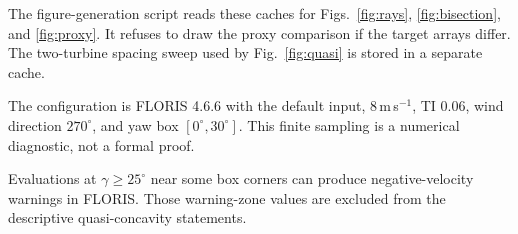 \documentclass[wes, manuscript]{copernicus}
\begin{document}
The figure-generation script reads these caches for Figs.~\ref{fig:rays}, \ref{fig:bisection}, and \ref{fig:proxy}. It refuses to draw the proxy comparison if the target arrays differ. The two-turbine spacing sweep used by Fig.~\ref{fig:quasi} is stored in a separate cache.

The configuration is FLORIS 4.6.6 with the default input, 8\,m\,s$^{-1}$, TI 0.06, wind direction $270^\circ$, and yaw box $[0^\circ,30^\circ]$. This finite sampling is a numerical diagnostic, not a formal proof.

Evaluations at $\gamma\ge25^\circ$ near some box corners can produce negative-velocity warnings in FLORIS. Those warning-zone values are excluded from the descriptive quasi-concavity statements.

\noappendix




\end{document}

